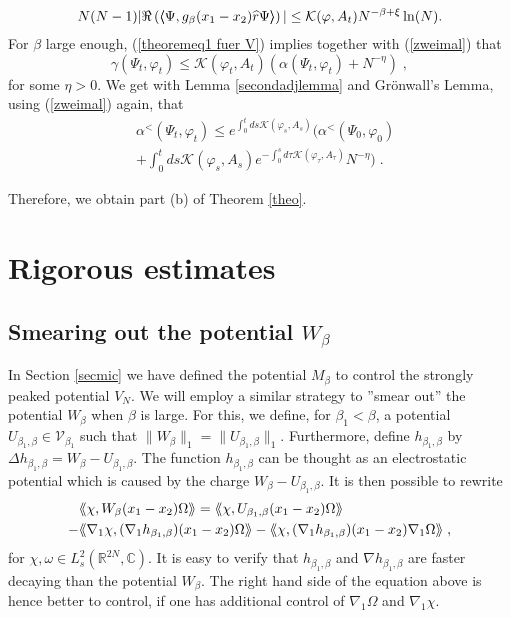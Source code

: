 \documentclass[11pt, english, american]{article}
\newcommand{\llaa}{\left\langle\hspace{-0.14cm}\left\langle}
\newcommand{\rraa}{\right\rangle\hspace{-0.14cm}\right\rangle}
\newcommand{\laa}{\langle\hspace{-0.08cm}\langle}
\newcommand{\raa}{\rangle\hspace{-0.08cm}\rangle}
\renewcommand{\phi}{\varphi}
\begin{document}
\begin{equation}
\label{zweimal}
N(N-1)|\Re\left(\llaa\Psi
, g_{\beta}(x_{1}-x_{2}) \widehat{r}
\Psi\rraa\right) |
\leq  \mathcal{K}(\phi, A_t)
N^{-\beta+\xi} \ln(N).
\end{equation} 
For $\beta$ large enough, (\ref{theoremeq1 fuer V}) implies together with (\ref{zweimal})  that 
$$\gamma(\Psi_t,\phi_t)\leq   \mathcal{K}(\phi_t, A_t)
\left(\alpha(\Psi_t,\phi_t)
+ N^{-\eta}\right)\;,
$$
for some $\eta>0$.
We get with Lemma \ref{secondadjlemma} and Gr\"onwall's Lemma, 
using (\ref{zweimal}) again,
that
\begin{align*}
&\alpha^<(\Psi_t,\phi_t)\leq  
e^{
\int_0^t ds \mathcal{K}(\phi_s, A_s)}
\Big(
\alpha^<(\Psi_0,\phi_0)
\\
&+
\int_0^t ds
\mathcal{K}(\phi_s, A_s)
e^{-\int_0^s d \tau \mathcal{K}(\phi_\tau, A_\tau)}
 N^{-\eta}
 \Big) \;.
\end{align*}

Therefore, we obtain part (b) of  Theorem \ref{theo}.




\section{Rigorous estimates}
\label{rigestimates}
\subsection{Smearing out the potential $W_\beta$}
In Section \ref{secmic} we have defined  the potential $M_\beta$ to control the strongly peaked potential $V_N$. 
We will employ a similar strategy to ''smear out'' the potential $W_\beta$ when $\beta$ is large. For this, we define, for $\beta_1<\beta$, a potential $U_{\beta_1,\beta} \in \mathcal{V}_{\beta_1}$ such that
$\|W_\beta\|_1=\|U_{\beta_1,\beta} \|_1$. Furthermore, define  $h_{\beta_1,\beta}$ by
$ \Delta h_{\beta_1,\beta}=W_{\beta}-U_{\beta_1,\beta}$. 
The function $h_{\beta_1,\beta}$ can be thought as an electrostatic potential which is caused by the charge $ W_{\beta}-U_{\beta_1,\beta}$.
It is then possible to rewrite 
\begin{align*}
&\laa \chi, W_\beta(x_1-x_2) \Omega \raa =
\laa \chi, U_{\beta_1,\beta}(x_1-x_2)  \Omega \raa
\\
-&
\laa \nabla_1 \chi, (\nabla_1 h_{\beta_1,\beta}) (x_1-x_2) \Omega \raa
-
\laa \chi, (\nabla_1 h_{\beta_1,\beta}) (x_1-x_2) \nabla_1 \Omega \raa
\; ,
\end{align*}
for $\chi, \omega \in L^2_s(\mathbb{R}^{2N},\mathbb{C})$. 
 It is easy to verify that $h_{\beta_1,\beta}$ and $ \nabla h_{\beta_1,\beta}$ are faster decaying than the potential $W_\beta$. 
The right hand side of the equation above is hence better to control, if one has additional control of $\nabla_1 \Omega$ and $\nabla_1 \chi$.
\end{document}
